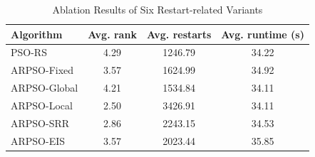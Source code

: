 \begin{table}[!t]
\caption{Ablation Results of Six Restart-related Variants}
\centering
\begin{tabular}{lccc}
\toprule
Algorithm & Avg. rank & Avg. restarts & Avg. runtime (s) \\
\midrule
PSO-RS & 4.29 & 1246.79 & 34.22 \\
ARPSO-Fixed & 3.57 & 1624.99 & 34.92 \\
ARPSO-Global & 4.21 & 1534.84 & 34.11 \\
ARPSO-Local & 2.50 & 3426.91 & 34.11 \\
ARPSO-SRR & 2.86 & 2243.15 & 34.53 \\
ARPSO-EIS & 3.57 & 2023.44 & 35.85 \\
\bottomrule
\end{tabular}
\label{tab:ablation}
\end{table}